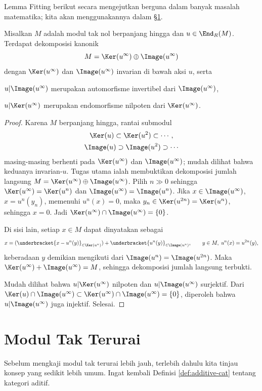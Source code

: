 Lemma Fitting berikut secara mengejutkan berguna dalam banyak masalah matematika; kita akan menggunakannya dalam \S\ref{sec:indecomposable-mod}.
\begin{lemma}[H.\ Fitting]\label{prop:Fitting}
	Misalkan $M$ adalah modul tak nol berpanjang hingga dan $u \in \End_R(M)$. Terdapat dekomposisi kanonik
	\[ M = \Ker(u^\infty) \oplus \Image(u^\infty) \]
dengan $\Ker(u^\infty)$ dan $\Image(u^\infty)$ invarian di bawah aksi $u$, serta
	\begin{compactitem}
		\item $u|\Image(u^\infty)$ merupakan automorfisme invertibel dari $\Image(u^\infty)$,
		\item $u|\Ker(u^\infty)$ merupakan endomorfisme nilpoten dari $\Ker(u^\infty)$.
	\end{compactitem}
\end{lemma}
\begin{proof}
	Karena $M$ berpanjang hingga, rantai submodul
	\begin{gather*}
		\Ker(u) \subset \Ker(u^2) \subset \cdots, \\
		\Image(u) \supset \Image(u^2) \supset \cdots
	\end{gather*}
masing-masing berhenti pada $\Ker(u^\infty)$ dan $\Image(u^\infty)$; mudah dilihat bahwa keduanya invarian-$u$. Tugas utama ialah membuktikan dekomposisi jumlah langsung $M = \Ker(u^\infty) \oplus \Image(u^\infty)$. Pilih $n \gg 0$ sehingga $\Ker(u^\infty) = \Ker(u^n)$ dan $\Image(u^\infty) = \Image(u^n)$. Jika $x \in \Image(u^\infty)$, $x = u^n(y_n)$, memenuhi $u^n(x)=0$, maka $y_n \in \Ker(u^{2n})=\Ker(u^n)$, sehingga $x=0$. Jadi $\Ker(u^\infty) \cap \Image(u^\infty) = \{0\}$.
	
	Di sisi lain, setiap $x \in M$ dapat dinyatakan sebagai
	\[ x = (\underbracket{x - u^n(y)}_{\in \Ker(u^n)}) + \underbracket{u^n(y)}_{\in \Image(u^n)}, \qquad y \in M, \; u^n(x) = u^{2n}(y), \]
keberadaan $y$ demikian mengikuti dari $\Image(u^n) = \Image(u^{2n})$. Maka $\Ker(u^\infty) + \Image(u^\infty) = M$, sehingga dekomposisi jumlah langsung terbukti.

Mudah dilihat bahwa $u|\Ker(u^\infty)$ nilpoten dan $u|\Image(u^\infty)$ surjektif. Dari $\Ker(u) \cap \Image(u^\infty) \subset \Ker(u^\infty) \cap \Image(u^\infty) = \{0\}$, diperoleh bahwa $u|\Image(u^\infty)$ juga injektif. Selesai.
\end{proof}

\section{Modul Tak Terurai}\label{sec:indecomposable-mod}
Sebelum mengkaji modul tak terurai lebih jauh, terlebih dahulu kita tinjau konsep yang sedikit lebih umum. Ingat kembali Definisi \ref{def:additive-cat} tentang kategori aditif.


